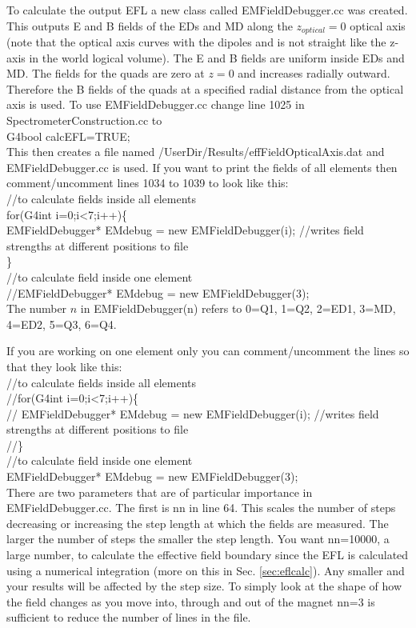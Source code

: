 \documentclass[letter,11pt]{article}
\newcommand{\filefont}[1]{{\scriptsize\ttfamily\selectfont #1}\xspace}
\begin{document}
To calculate the output EFL a new class called EMFieldDebugger.cc was created. This outputs E and B fields of the EDs and MD along the $z_{optical}=0$ optical axis (note that the optical axis curves with the dipoles and is not straight like the z-axis in the world logical volume). The E and B fields are uniform inside EDs and MD. The fields for the quads are zero at $z=0$ and increases radially outward. Therefore the B fields of the quads at a specified radial distance from the optical axis is used. To use EMFieldDebugger.cc change line 1025 in SpectrometerConstruction.cc to\\
\filefont{G4bool calcEFL=TRUE;}\\
This then creates a file named /UserDir/Results/effFieldOpticalAxis.dat and EMFieldDebugger.cc is used. If you want to print the fields of all elements then comment/uncomment lines 1034 to 1039 to look like this:\\
\filefont{      //to calculate fields inside all elements\\
      for(G4int i=0;i<7;i++)\{\\
        EMFieldDebugger* EMdebug = new EMFieldDebugger(i); //writes field strengths at different positions to file\\
      \}\\
      //to calculate field inside one element\\
      //EMFieldDebugger* EMdebug = new EMFieldDebugger(3);}\\
The number $n$ in \filefont{EMFieldDebugger(n)} refers to 0=Q1, 1=Q2, 2=ED1, 3=MD, 4=ED2, 5=Q3, 6=Q4.

If you are working on one element only you can comment/uncomment the lines so that they look like this:\\
\filefont{      //to calculate fields inside all elements\\
      //for(G4int i=0;i<7;i++)\{\\
      //  EMFieldDebugger* EMdebug = new EMFieldDebugger(i); //writes field strengths at different positions to file\\
      //\}\\
      //to calculate field inside one element\\
      EMFieldDebugger* EMdebug = new EMFieldDebugger(3);}\\

There are two parameters that are of particular importance in EMFieldDebugger.cc. The first is \filefont{nn} in line 64. This scales the number of steps decreasing or increasing the step length at which the fields are measured. The larger the number of steps the smaller the step length. You want \filefont{nn=10000}, a large number, to calculate the effective field boundary since the EFL is calculated using a numerical integration (more on this in Sec. \ref{sec:eflcalc}). Any smaller and your results will be affected by the step size. To simply look at the shape of how the field changes as you move into, through and out of the magnet \filefont{nn=3} is sufficient to reduce the number of lines in the file.
\end{document}
